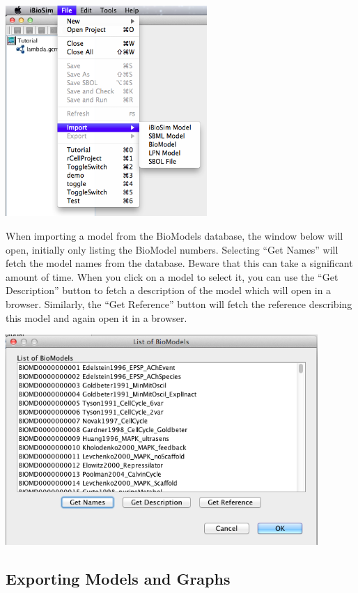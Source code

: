 \documentclass[titlepage,11pt]{article}
\begin{document}
\begin{center}
\includegraphics[height=80mm]{screenshots/import}
\end{center} 

When importing a model from the BioModels database, the window below will open, initially only listing the BioModel numbers.  Selecting ``Get Names'' will fetch the model names from the database.  Beware that this can take a significant amount of time.  When you click on a model to select it, you can use the ``Get Description'' button to fetch a description of the model which will open in a browser.  Similarly, the ``Get Reference'' button will fetch the reference describing this model and again open it in a browser.

\begin{center}
\includegraphics[height=80mm]{screenshots/BioModels}
\end{center} 

\subsection{Exporting Models and Graphs}
\end{document}
